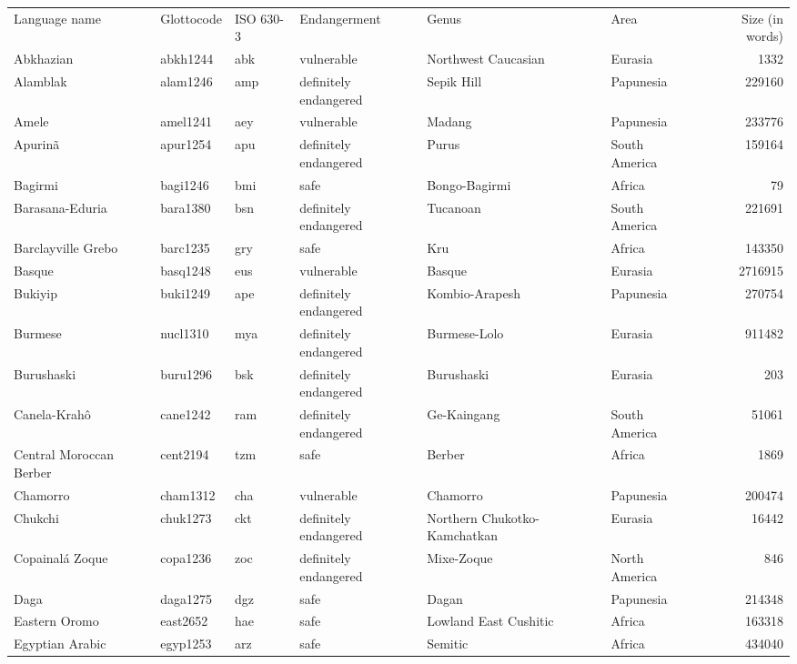 \begin{longtable}{llllllr}
  \hline
Language name & Glottocode & ISO 630-3 & Endangerment & Genus & Area & Size (in words) \\ 
 Abkhazian & abkh1244 & abk & vulnerable & Northwest Caucasian & Eurasia & 1332 \\ 
  Alamblak & alam1246 & amp & definitely endangered & Sepik Hill & Papunesia & 229160 \\ 
  Amele & amel1241 & aey & vulnerable & Madang & Papunesia & 233776 \\ 
  Apurinã & apur1254 & apu & definitely endangered & Purus & South America & 159164 \\ 
  Bagirmi & bagi1246 & bmi & safe & Bongo-Bagirmi & Africa & 79 \\ 
  Barasana-Eduria & bara1380 & bsn & definitely endangered & Tucanoan & South America & 221691 \\ 
  Barclayville Grebo & barc1235 & gry & safe & Kru & Africa & 143350 \\ 
  Basque & basq1248 & eus & vulnerable & Basque & Eurasia & 2716915 \\ 
  Bukiyip & buki1249 & ape & definitely endangered & Kombio-Arapesh & Papunesia & 270754 \\ 
  Burmese & nucl1310 & mya & definitely endangered & Burmese-Lolo & Eurasia & 911482 \\ 
  Burushaski & buru1296 & bsk & definitely endangered & Burushaski & Eurasia & 203 \\ 
  Canela-Krahô & cane1242 & ram & definitely endangered & Ge-Kaingang & South America & 51061 \\ 
  Central Moroccan Berber & cent2194 & tzm & safe & Berber & Africa & 1869 \\ 
  Chamorro & cham1312 & cha & vulnerable & Chamorro & Papunesia & 200474 \\ 
  Chukchi & chuk1273 & ckt & definitely endangered & Northern Chukotko-Kamchatkan & Eurasia & 16442 \\ 
  Copainalá Zoque & copa1236 & zoc & definitely endangered & Mixe-Zoque & North America & 846 \\ 
  Daga & daga1275 & dgz & safe & Dagan & Papunesia & 214348 \\ 
  Eastern Oromo & east2652 & hae & safe & Lowland East Cushitic & Africa & 163318 \\ 
  Egyptian Arabic & egyp1253 & arz & safe & Semitic & Africa & 434040 \\ 

\end{longtable}
